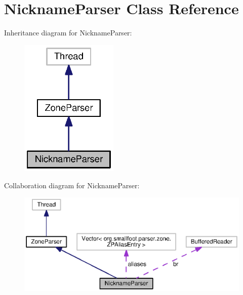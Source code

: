 \section{Nickname\+Parser Class Reference}
\label{classorg_1_1smallfoot_1_1parser_1_1zone_1_1NicknameParser}


Inheritance diagram for Nickname\+Parser\+:\nopagebreak
\begin{figure}[H]
\begin{center}
\leavevmode
\includegraphics[width=132pt]{classorg_1_1smallfoot_1_1parser_1_1zone_1_1NicknameParser__inherit__graph}
\end{center}
\end{figure}


Collaboration diagram for Nickname\+Parser\+:\nopagebreak
\begin{figure}[H]
\begin{center}
\leavevmode
\includegraphics[width=350pt]{classorg_1_1smallfoot_1_1parser_1_1zone_1_1NicknameParser__coll__graph}
\end{center}
\end{figure}
